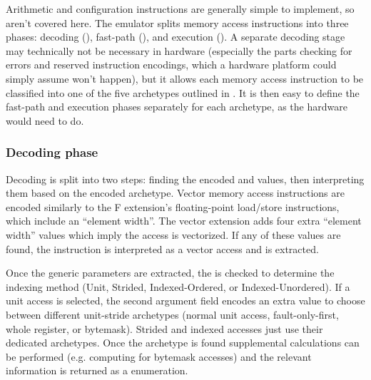 Arithmetic and configuration instructions are generally simple to implement, so aren't covered here.
The emulator splits memory access instructions into three phases: decoding (\todoref{}), fast-path (\todoref{}), and execution (\todoref{}).
A separate decoding stage may technically not be necessary in hardware (especially the parts checking for errors and reserved instruction encodings, which a hardware platform could simply assume won't happen), but it allows each memory access instruction to be classified into one of the five archetypes outlined in .
It is then easy to define the fast-path and execution phases separately for each archetype, as the hardware would need to do.

\subsubsection{Decoding phase}
Decoding is split into two steps: finding the encoded  and  values, then interpreting them based on the encoded archetype.
Vector memory access instructions are encoded similarly to the F extension's floating-point load/store instructions, which include an ``element width''.
The vector extension adds four extra ``element width'' values which imply the access is vectorized.
If any of these values are found, the instruction is interpreted as a vector access and  is extracted.

Once the generic parameters are extracted, the  is checked to determine the indexing method (Unit, Strided, Indexed-Ordered, or Indexed-Unordered).
If a unit access is selected, the second argument field encodes an extra value to choose between different unit-stride archetypes (normal unit access, fault-only-first, whole register, or bytemask).
Strided and indexed accesses just use their dedicated archetypes.
Once the archetype is found supplemental calculations can be performed (e.g. computing  for bytemask accesses) and the relevant information is returned as a  enumeration.


